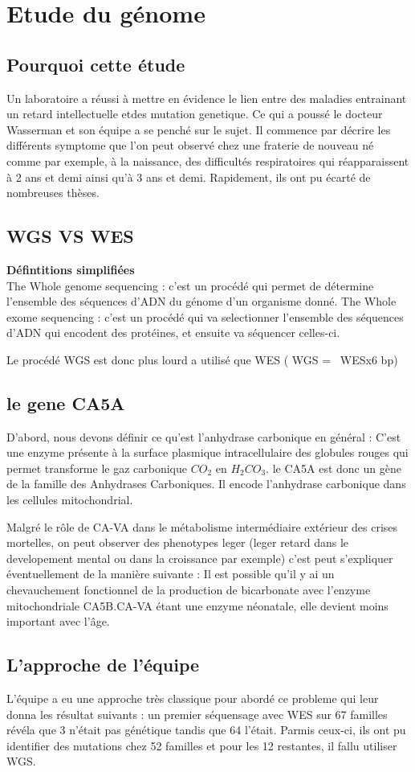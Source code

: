 \section{Etude du génome}

\subsection{Pourquoi cette étude}

Un laboratoire a réussi à mettre en évidence le lien entre des maladies entrainant un retard intellectuelle etdes mutation genetique.
Ce qui a poussé le docteur Wasserman et son équipe a se penché sur le sujet.
Il commence par décrire les différents symptome que l'on peut observé chez une fraterie de nouveau né comme par exemple, à la naissance, des difficultés respiratoires qui réapparaissent à 2 ans et demi ainsi qu'à 3 ans et demi.
Rapidement, ils ont pu écarté de nombreuses thèses.

\subsection{WGS VS WES}
\textbf{Défintitions simplifiées}\\
The Whole genome sequencing : c'est un procédé qui permet de détermine l'ensemble des séquences d'ADN du génome d'un organisme donné.
The Whole exome sequencing : c'est un procédé qui va selectionner l'ensemble des séquences d'ADN qui encodent des protéines, et ensuite va séquencer celles-ci.

Le procédé WGS est donc plus lourd a utilisé que WES ( WGS = ~WESx6 bp)

\subsection{le gene CA5A}
D'abord, nous devons définir ce qu'est l'anhydrase carbonique en général : 
C'est une enzyme présente à la surface plasmique intracellulaire des globules rouges qui permet transforme le gaz carbonique $CO_2$ en $H_2CO_3$.
le CA5A est donc un gène de la famille des Anhydrases Carboniques. Il encode l'anhydrase carbonique dans les cellules mitochondrial.

Malgré le rôle de CA-VA dans le métabolisme intermédiaire extérieur des crises mortelles, on peut observer des phenotypes leger (leger retard dans le developement mental ou dans la croissance par exemple)
c'est peut s'expliquer éventuellement de la manière suivante :
Il est possible qu'il y ai un chevauchement fonctionnel de la production de bicarbonate avec l'enzyme mitochondriale CA5B.CA-VA étant une enzyme néonatale, elle devient moins important avec l'âge.

\subsection{L'approche de l'équipe}

L'équipe a eu une approche très classique pour abordé ce probleme qui leur donna les résultat suivants :
un premier séquensage avec WES sur 67 familles révéla que 3 n'était pas génétique tandis que 64 l'était. Parmis ceux-ci, ils ont pu identifier des mutations chez 52 familles et pour les 12 restantes, il fallu utiliser WGS.
